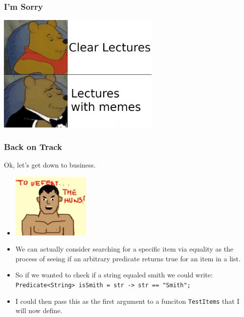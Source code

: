 \documentclass{beamer}
\begin{document}
\begin{frame}
  \frametitle{I'm Sorry}
  \centering \includegraphics[width=0.6\textwidth]{images/unnecessary.png}
\end{frame}


\begin{frame}
  \frametitle{Back on Track}
  Ok, let's get down to business.
  \begin{itemize}
  \item<2-> \includegraphics[width=0.3\textwidth]{images/business.png}
  \item<3-> We can actually consider searching for a specific item via equality
    as the process of seeing if an arbitrary predicate returns true for an item
    in a list.
  \item<4-> So if we wanted to check if a string equaled smith we could write:
    \texttt{Predicate<String> isSmith = str -> str == "Smith";}
  \item<5-> I could then pass this as the first argument to a funciton \texttt{TestItems}
    that I will now define.
  \end{itemize}
\end{frame}
\end{document}
